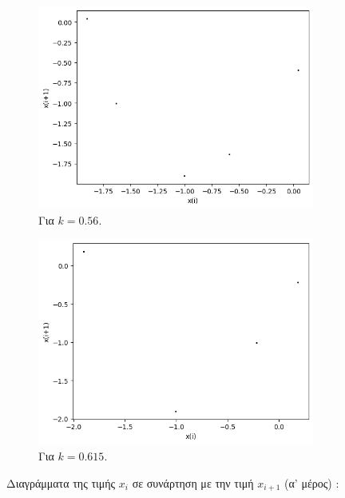 \begin{figure}[h!]
\begin{subfigure}[b]{0.4\textwidth}
		\includegraphics[width=\textwidth]{LateX images/graphs q19/g7}
		\caption{Για $k=0.56$.}
		\label{f:k96}
	\end{subfigure}
	\hfill
	\begin{subfigure}[b]{0.4\textwidth}
		\centering
		\includegraphics[width=\textwidth]{LateX images/graphs q19/g8}
		\caption{Για $k=0.615$.}
		\label{f:k97}
\end{subfigure}
\hfill		
	\caption{Διαγράμματα της τιμής \(x_i\) σε συνάρτηση με την τιμή \(x_{i+1}\) (α' μέρος) :}
	\label{f:k242}
\end{figure}
